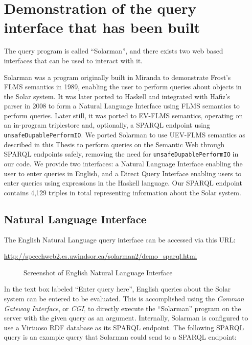 \documentclass[../main.tex]{subfiles}
\begin{document}
\chapter{Demonstration of the query interface that has been built}
\label{chapter:demonstration}

The query program is called ``Solarman'', and there exists two web based interfaces that can be used to interact with it.

Solarman was a program originally built in Miranda to demonstrate Frost's FLMS semantics in 1989\cite{frost1989constructing}, enabling the user
to perform queries about objects in the Solar system.  It was later ported to Haskell and integrated with Hafiz's parser in 2008\cite{frosthafiz2008}
to form a Natural Language Interface using FLMS semantics to perform queries.  Later still, it was ported to EV-FLMS semantics, operating on an in-program
triplestore and, optionally, a SPARQL endpoint using \texttt{unsafeDupablePerformIO}.  We ported Solarman to use UEV-FLMS semantics as described in this Thesis to perform queries on the Semantic Web through SPARQL endpoints safely, removing the need for \texttt{unsafeDupablePerformIO} in our code.
We provide two interfaces: a Natural Language Interface enabling the user to enter queries in English, and a Direct Query Interface enabling users
to enter queries using expressions in the Haskell language.   Our SPARQL endpoint contains 4,129 triples in total representing information about the Solar system.

\section{Natural Language Interface}

The English Natural Language query interface can be accessed via this URL:

\url{http://speechweb2.cs.uwindsor.ca/solarman2/demo_sparql.html}


\begin{figure}[h]
\centering
{}
\caption{Screenshot of English Natural Language Interface}
\end{figure}
In the text box labeled ``Enter query here'', English queries about the Solar system can be entered to be evaluated.  This is accomplished using the {\em Common Gateway Interface}, or {\em CGI}, to directly execute the ``Solarman'' program on the server with the given query as an argument.  Internally, Solarman is configured to use a Virtuoso\cite{virtuoso} RDF database as its SPARQL endpoint.  The following SPARQL query is an example query that Solarman could send to a SPARQL endpoint:
\end{document}
